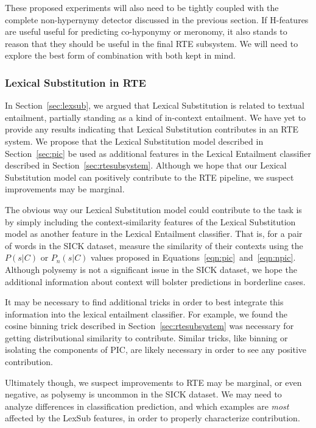 \documentclass[12pt]{article}
\begin{document}
These proposed experiments will also need to be tightly coupled with the
complete non-hypernymy detector discussed in the previous section. If H-features
are useful useful for predicting co-hyponymy or meronomy, it also stands to
reason that they should be useful in the final RTE subsystem. We will need to
explore the best form of combination with both kept in mind.

\subsubsection{Lexical Substitution in RTE}

In Section~\ref{sec:lexsub}, we argued that Lexical Substitution is
related to textual entailment, partially standing
as a kind of in-context entailment. We have yet to provide any results
indicating that Lexical Substitution contributes in an
RTE system.  We propose that the Lexical Substitution model described in
Section~\ref{sec:pic} be used as additional features in the Lexical
Entailment classifier described in Section~\ref{sec:rtesubsystem}. Although we hope that
our Lexical Substitution model can positively contribute to the RTE pipeline,
we suspect improvements may be marginal.

The obvious way our Lexical Substitution model could contribute to the
task is by simply including the context-similarity features of the Lexical
Substitution model as another feature in the Lexical Entailment classifier.
That is, for a pair of words in the SICK dataset, measure the similarity of
their contexts using the $P(s|C)$ or $P_n(s|C)$ values proposed in
Equations~\ref{eqn:pic}~and~\ref{eqn:npic}. Although polysemy is not a
significant issue in the SICK dataset, we hope the additional information
about context will bolster predictions in borderline cases.

It may be necessary to find additional tricks in order to best integrate
this information into the lexical entailment classifier. For example, we
found the cosine binning trick described in Section~\ref{sec:rtesubsystem}
was necessary for getting distributional similarity to contribute. Similar
tricks, like binning or isolating the components of PIC, are likely
necessary in order to see any positive contribution.

Ultimately though, we suspect improvements to RTE  may be marginal, or even
negative, as polysemy is uncommon in the SICK dataset. We may need to analyze
differences in classification prediction, and which examples are {\em most}
affected by the LexSub features, in order to properly characterize contribution.
\end{document}
